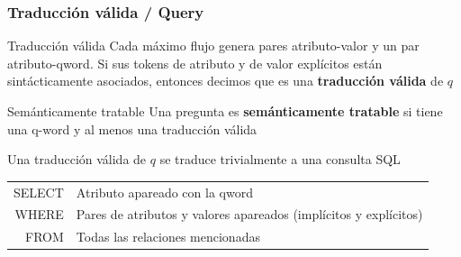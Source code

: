 




\begin{frame}[<+->] \fontsize{9.5pt}{8.2}\selectfont
  \frametitle{Traducción válida / Query}    
    \begin{exampleblock}{Traducción válida}
     Cada máximo flujo genera pares atributo-valor y un par atributo-qword. Si sus tokens de atributo y de valor explícitos están sintácticamente asociados, entonces decimos que es una \textbf{traducción válida} de $q$
    \end{exampleblock}

  \begin{alertblock}{Semánticamente tratable}
    Una pregunta es \textbf{semánticamente tratable} si tiene una q-word y al menos una traducción válida
  \end{alertblock}

    \begin{block}{Una traducción válida de $q$ se traduce trivialmente a una consulta SQL}        
    \begin{tabular}{ r | l }
    {\color{purple}SELECT} &  Atributo apareado con la qword \\
    {\color{purple}WHERE} & Pares de atributos y valores apareados (implícitos y explícitos)\\
    {\color{purple}FROM} & Todas las relaciones mencionadas \\
    \end{tabular}
    \end{block}



\end{frame}


